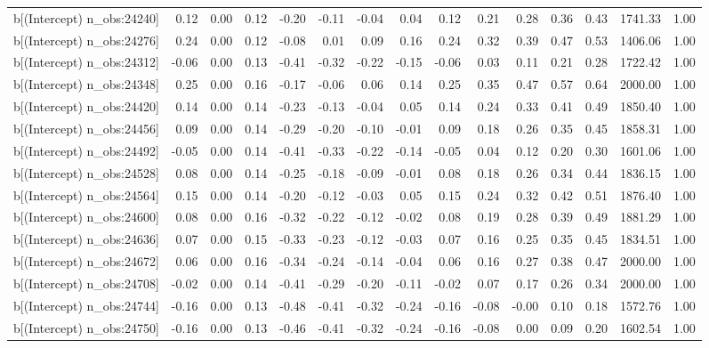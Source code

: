 \begin{table}[ht]
\begin{tabular}{rrrrrrrrrrrrrrr}
  b[(Intercept) n\_obs:24240] & 0.12 & 0.00 & 0.12 & -0.20 & -0.11 & -0.04 & 0.04 & 0.12 & 0.21 & 0.28 & 0.36 & 0.43 & 1741.33 & 1.00 \\ 
  b[(Intercept) n\_obs:24276] & 0.24 & 0.00 & 0.12 & -0.08 & 0.01 & 0.09 & 0.16 & 0.24 & 0.32 & 0.39 & 0.47 & 0.53 & 1406.06 & 1.00 \\ 
  b[(Intercept) n\_obs:24312] & -0.06 & 0.00 & 0.13 & -0.41 & -0.32 & -0.22 & -0.15 & -0.06 & 0.03 & 0.11 & 0.21 & 0.28 & 1722.42 & 1.00 \\ 
  b[(Intercept) n\_obs:24348] & 0.25 & 0.00 & 0.16 & -0.17 & -0.06 & 0.06 & 0.14 & 0.25 & 0.35 & 0.47 & 0.57 & 0.64 & 2000.00 & 1.00 \\ 
  b[(Intercept) n\_obs:24420] & 0.14 & 0.00 & 0.14 & -0.23 & -0.13 & -0.04 & 0.05 & 0.14 & 0.24 & 0.33 & 0.41 & 0.49 & 1850.40 & 1.00 \\ 
  b[(Intercept) n\_obs:24456] & 0.09 & 0.00 & 0.14 & -0.29 & -0.20 & -0.10 & -0.01 & 0.09 & 0.18 & 0.26 & 0.35 & 0.45 & 1858.31 & 1.00 \\ 
  b[(Intercept) n\_obs:24492] & -0.05 & 0.00 & 0.14 & -0.41 & -0.33 & -0.22 & -0.14 & -0.05 & 0.04 & 0.12 & 0.20 & 0.30 & 1601.06 & 1.00 \\ 
  b[(Intercept) n\_obs:24528] & 0.08 & 0.00 & 0.14 & -0.25 & -0.18 & -0.09 & -0.01 & 0.08 & 0.18 & 0.26 & 0.34 & 0.44 & 1836.15 & 1.00 \\ 
  b[(Intercept) n\_obs:24564] & 0.15 & 0.00 & 0.14 & -0.20 & -0.12 & -0.03 & 0.05 & 0.15 & 0.24 & 0.32 & 0.42 & 0.51 & 1876.40 & 1.00 \\ 
  b[(Intercept) n\_obs:24600] & 0.08 & 0.00 & 0.16 & -0.32 & -0.22 & -0.12 & -0.02 & 0.08 & 0.19 & 0.28 & 0.39 & 0.49 & 1881.29 & 1.00 \\ 
  b[(Intercept) n\_obs:24636] & 0.07 & 0.00 & 0.15 & -0.33 & -0.23 & -0.12 & -0.03 & 0.07 & 0.16 & 0.25 & 0.35 & 0.45 & 1834.51 & 1.00 \\ 
  b[(Intercept) n\_obs:24672] & 0.06 & 0.00 & 0.16 & -0.34 & -0.24 & -0.14 & -0.04 & 0.06 & 0.16 & 0.27 & 0.38 & 0.47 & 2000.00 & 1.00 \\ 
  b[(Intercept) n\_obs:24708] & -0.02 & 0.00 & 0.14 & -0.41 & -0.29 & -0.20 & -0.11 & -0.02 & 0.07 & 0.17 & 0.26 & 0.34 & 2000.00 & 1.00 \\ 
  b[(Intercept) n\_obs:24744] & -0.16 & 0.00 & 0.13 & -0.48 & -0.41 & -0.32 & -0.24 & -0.16 & -0.08 & -0.00 & 0.10 & 0.18 & 1572.76 & 1.00 \\ 
  b[(Intercept) n\_obs:24750] & -0.16 & 0.00 & 0.13 & -0.46 & -0.41 & -0.32 & -0.24 & -0.16 & -0.08 & 0.00 & 0.09 & 0.20 & 1602.54 & 1.00 \\ 

\end{tabular}
\end{table}
